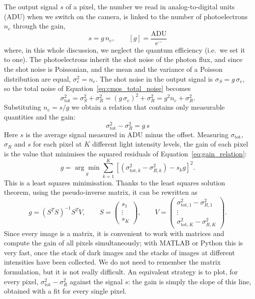 \documentclass[letterpaper,11pt,leqno]{book}
\begin{document}
The output signal $s$ of a pixel, the number we read in analog-to-digital units (ADU) when we switch on the camera, is linked to the number of photoelectrons $n_e$ through the gain,
\begin{equation}
\boxed{s = g\,n_e, \qquad [g] = \frac{\text{ADU}}{e^-}}
\label{eq:cmos_gain}
\end{equation}
where, in this whole discussion, we neglect the quantum efficiency (i.e.\ we set it to one). The photoelectrons inherit the shot noise of the photon flux, and since the shot noise is Poissonian, and the mean and the variance of a Poisson distribution are equal, $\sigma_e^2 = n_e$. The shot noise in the output signal is $\sigma_S = g\,\sigma_e$, so the total noise of Equation~\eqref{eq:cmos_total_noise} becomes
\begin{equation}
\sigma_{\text{tot}}^2 = \sigma_S^2 + \sigma_R^2 = (g\,\sigma_e)^2 + \sigma_R^2 = g^2n_e + \sigma_R^2.
\end{equation}
Substituting $n_e = s/g$ we obtain a relation that contains only measurable quantities and the gain:
\begin{equation}
\boxed{\sigma_{\text{tot}}^2 - \sigma_R^2 = g\,s}
\label{eq:gain_relation}
\end{equation}
Here $s$ is the average signal measured in ADU minus the offset. Measuring $\sigma_{\text{tot}}$, $\sigma_R$ and $s$ for each pixel at $K$ different light intensity levels, the gain of each pixel is the value that minimises the squared residuals of Equation~\eqref{eq:gain_relation}:
\begin{equation}
g = \underset{g}{\arg\min}\sum_{k=1}^{K}\left[\left(\sigma_{\text{tot},k}^2 - \sigma_{R,k}^2\right) - s_kg\right]^2.
\label{eq:gain_least_squares}
\end{equation}
This is a least squares minimisation. Thanks to the least squares solution theorem, using the pseudo-inverse matrix, it can be rewritten as
\begin{equation}
\boxed{g = \left(S^TS\right)^{-1}S^TV}, \qquad S = \begin{pmatrix} s_1 \\ \vdots \\ s_K \end{pmatrix}, \qquad V = \begin{pmatrix} \sigma_{\text{tot},1}^2 - \sigma_{R,1}^2 \\ \vdots \\ \sigma_{\text{tot},K}^2 - \sigma_{R,K}^2 \end{pmatrix}.
\label{eq:gain_pseudoinverse}
\end{equation}
Since every image is a matrix, it is convenient to work with matrices and compute the gain of all pixels simultaneously; with MATLAB or Python this is very fast, once the stack of dark images and the stacks of images at different intensities have been collected. We do not need to remember the matrix formulation, but it is not really difficult. An equivalent strategy is to plot, for every pixel, $\sigma_{\text{tot}}^2 - \sigma_R^2$ against the signal $s$: the gain is simply the slope of this line, obtained with a fit for every single pixel.
\end{document}
